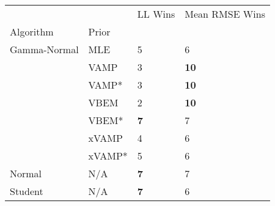 \begin{tabular}{llll}
\toprule
        &     &     LL Wins & Mean RMSE Wins \\
Algorithm & Prior &             &                \\
\midrule
Gamma-Normal & MLE &           5 &              6 \\
        & VAMP &           3 &    \textbf{10} \\
        & VAMP* &           3 &    \textbf{10} \\
        & VBEM &           2 &    \textbf{10} \\
        & VBEM* &  \textbf{7} &              7 \\
        & xVAMP &           4 &              6 \\
        & xVAMP* &           5 &              6 \\
Normal & N/A &  \textbf{7} &              7 \\
Student & N/A &  \textbf{7} &              6 \\
\bottomrule
\end{tabular}

